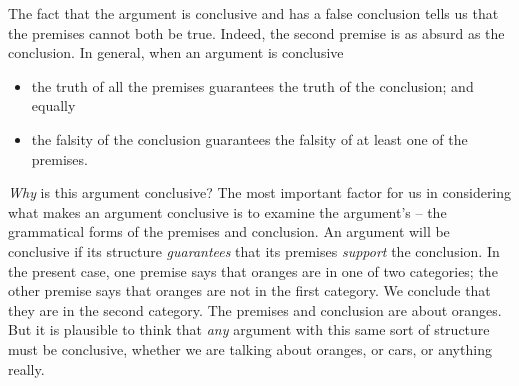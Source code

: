 The fact that the argument is conclusive and has a false conclusion tells us that the premises cannot both be true. Indeed, the second premise is as absurd as the conclusion. In general, when an argument is conclusive \begin{itemize}
	\item the truth of all the premises guarantees the truth of the conclusion; and equally
	\item the falsity of the conclusion guarantees the falsity of at least one of the premises. 
\end{itemize}

\emph{Why} is this argument conclusive? The most important factor for us in considering what makes an argument conclusive is to examine the argument's  – the grammatical forms of the premises and conclusion. An argument will be conclusive if its structure \emph{guarantees} that its premises \emph{support} the conclusion. In the present case, one premise says that oranges are in one of two categories; the other premise says that oranges are not in the first category. We conclude that they are in the second category. The premises and conclusion are about oranges. But it is plausible to think that \emph{any} argument with this same sort of structure must be conclusive, whether we are talking about oranges, or cars, or anything really. 


